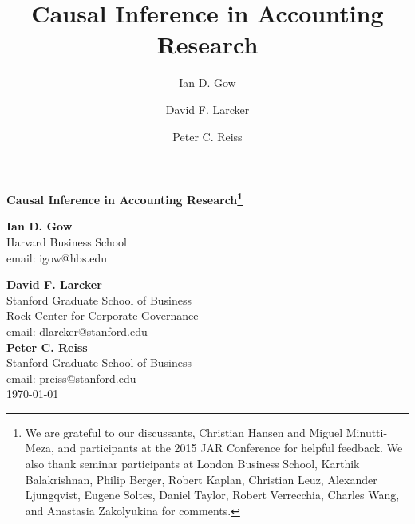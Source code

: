 \documentclass[12pt,reqno,titlepage]{amsart}
\title[Causal Inference in Accounting]{Causal Inference in Accounting Research}
\author{Ian D. Gow}
\author{David F. Larcker}
\author{Peter C. Reiss}
\theoremstyle{definition}
\begin{document}
\usetikzlibrary{automata, shapes, calc, positioning}



\begin{titlepage}
  \centering
  	\begin{large}
  	\textbf{Causal Inference in Accounting Research\footnote{We are grateful to our discussants, Christian Hansen and Miguel Minutti-Meza, and participants at the 2015 JAR Conference for helpful feedback. 
  	We also thank seminar participants at London Business School, Karthik Balakrishnan, Philip Berger, Robert Kaplan, Christian Leuz, Alexander Ljungqvist, Eugene Soltes, Daniel Taylor, Robert Verrecchia, Charles Wang, and Anastasia Zakolyukina for comments.}} \\	
  	\end{large}
  	\vspace{60pt}
	\textbf{Ian D. Gow} \\
	Harvard Business School \\
	email: igow@hbs.edu

  	\vspace{30pt}
	\textbf{David F. Larcker} \\
	Stanford Graduate School of Business \\
	Rock Center for Corporate Governance \\
	email: dlarcker@stanford.edu \\
		
	\vspace{30pt}
	\textbf{Peter C. Reiss} \\
	Stanford Graduate School of Business \\
	email: preiss@stanford.edu \\

	\vspace{30pt}
	\today

\end{titlepage}
\end{document}
